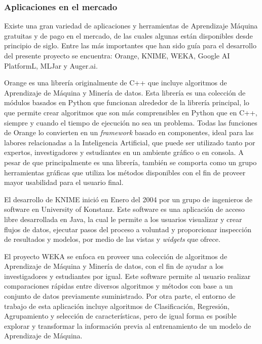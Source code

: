 \subsubsection{Aplicaciones en el mercado}

Existe una gran variedad de aplicaciones y herramientas de Aprendizaje Máquina gratuitas y de pago en el mercado, de las cuales algunas están disponibles desde principio de siglo. Entre las más importantes que han sido guía para el desarrollo del presente proyecto se encuentra: Orange, KNIME, WEKA, Google AI PlatformL, MLJar y Auger.ai.

\begin{APAitemize}
    \item Orange \parencite{Demsar2004} es una librería originalmente de C++ que incluye algoritmos de Aprendizaje de Máquina y Minería de datos. Esta librería es una colección de módulos basados en Python que funcionan alrededor de la librería principal, lo que permite crear algoritmos que son más comprensibles en Python que en C++, siempre y cuando el tiempo de ejecución no sea un problema. Todas las funciones de Orange lo convierten en un \textit{framework} basado en componentes, ideal para las labores relacionadas a la Inteligencia Artificial, que puede ser utilizado tanto por expertos, investigadores y estudiantes en un ambiente gráfico o en consola. A pesar de que principalmente es una librería, también se comporta como un grupo herramientas gráficas que utiliza los métodos disponibles con el fin de proveer mayor usabilidad para el usuario final.
    \item El desarrollo de KNIME \parencite{BCDG07} inició en Enero del 2004 por un grupo de ingenieros de software en University of Konstanz. Este software es una aplicación de acceso libre desarrollada en Java, la cual le permite a los usuarios visualizar y crear flujos de datos, ejecutar pasos del proceso a voluntad y proporcionar inspección de resultados y modelos, por medio de las vistas y \textit{widgets} que ofrece.
    \item El proyecto WEKA \parencite{Hall2009} se enfoca en proveer una colección de algoritmos de Aprendizaje de Máquina y Minería de datos, con el fin de ayudar a los investigadores y estudiantes por igual. Este software permite al usuario realizar comparaciones rápidas entre diversos algoritmos y métodos con base a un conjunto de datos previamente suministrado. Por otra parte, el entorno de trabajo de esta aplicación incluye algoritmos de Clasificación, Regresión, Agrupamiento y selección de características, pero de igual forma es posible explorar y transformar la información previa al entrenamiento de un modelo de Aprendizaje de Máquina.

\end{APAitemize}
